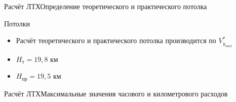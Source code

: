 \begin{frame}{Расчёт ЛТХ}{Определение теоретического и практического потолка}
    \begin{minipage}[c]{0.45\textwidth}
        \begin{block}{Потолки}
        \begin{itemize}
            \item  [] Расчёт теоретического и практического потолка производится по $V^*_{y_{max}}$
            \item  [] $H_\text{т} = 19,8$ км 
            \item  [] $H_\text{пр} = 19,5$ км
        \end{itemize}
        \end{block}
    \end{minipage}
    \begin{minipage}[c]{0.45\textwidth}
    \end{minipage}
\end{frame}

\begin{frame}{Расчёт ЛТХ}{Максимальные значения часового и километрового расходов}
\end{frame}

